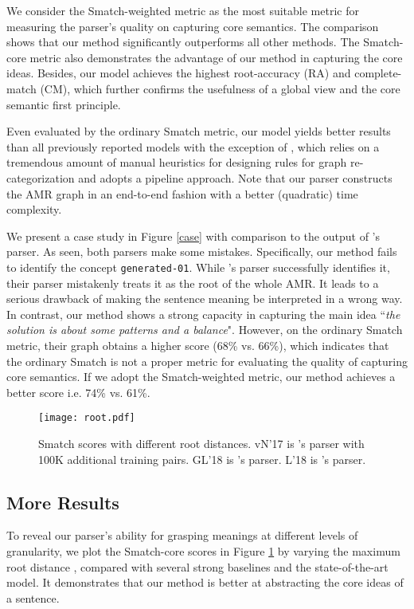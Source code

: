 \documentclass[11pt,a4paper]{article}
\begin{document}
	We consider the Smatch-weighted metric as the most suitable metric for measuring the parser's quality on capturing core semantics. The comparison shows that our method significantly outperforms all other methods. The Smatch-core metric also demonstrates the advantage of our method in capturing the core ideas. Besides, our model achieves the highest root-accuracy (RA) and complete-match (CM), which further confirms the usefulness of a global view and the core semantic first principle.
	
	Even evaluated by the ordinary Smatch metric, our model yields better results than all previously reported models with the exception of , which relies on a tremendous amount of manual heuristics for designing rules for graph re-categorization and adopts a pipeline approach. Note that our parser constructs the AMR graph in an end-to-end fashion with a better (quadratic) time complexity.
	
	We present a case study in Figure \ref{case} with comparison to the output of 's parser. As seen, both parsers make some mistakes. Specifically, our method fails to identify the concept \texttt{generated-01}. While 's parser successfully identifies it, their parser mistakenly treats it as the root of the whole AMR. It leads to a serious drawback of making the sentence meaning be interpreted in a wrong way. In contrast, our method shows a strong capacity in capturing the main idea ``\textit{the solution is about some patterns and a balance}". However, on the ordinary Smatch metric, their graph obtains a higher score (68\% vs. 66\%), which indicates that the ordinary Smatch is not a proper metric for evaluating the quality of capturing core semantics. If we adopt the Smatch-weighted metric, our method achieves a better score i.e. 74\% vs. 61\%.
	\begin{figure}[t]
		\centering
		\texttt{[image: root.pdf]}
		\caption{Smatch scores with different root distances. vN’17 is 's parser with 100K additional training pairs. GL'18 is 's parser. L'18 is 's parser.}
		\label{root}
	\end{figure}
	\subsection{More Results}
	\label{sibling}
	To reveal our parser's ability for grasping meanings at different levels of granularity, we plot the Smatch-core scores in Figure \ref{root}  by varying the maximum root distance , compared with several strong baselines and the state-of-the-art model. It demonstrates that our method is better at abstracting the core ideas of a sentence.
\end{document}
